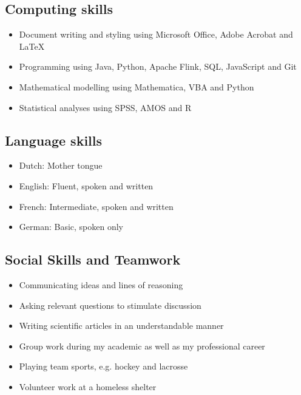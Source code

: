 \documentclass[a4paper,9pt]{extarticle}
\begin{document}
\subsection*{Computing skills}
\begin{itemize}[leftmargin=*]
\setlength{\itemsep}{-1mm}
\item Document writing and styling using Microsoft Office, Adobe Acrobat and LaTeX
\item Programming using Java, Python, Apache Flink, SQL, JavaScript and Git
\item Mathematical modelling using Mathematica, VBA and Python
\item Statistical analyses using SPSS, AMOS and R
\end{itemize}

\subsection*{Language skills}
\begin{itemize}[leftmargin=*]
\setlength{\itemsep}{-1mm}
\item Dutch: \tabto{16mm} Mother tongue
\item English: \tabto{16mm} Fluent, spoken and written
\item French: \tabto{16mm} Intermediate, spoken and written
\item German: \tabto{16mm} Basic, spoken only
\end{itemize}

\subsection*{Social Skills and Teamwork}
\begin{itemize}[leftmargin=*]
\setlength{\itemsep}{-1mm}
\item Communicating ideas and lines of reasoning
\item Asking relevant questions to stimulate discussion
\item Writing scientific articles in an understandable manner
\item Group work during my academic as well as my professional career
\item Playing team sports, e.g. hockey and lacrosse
\item Volunteer work at a homeless shelter
\end{itemize}
\end{document}
